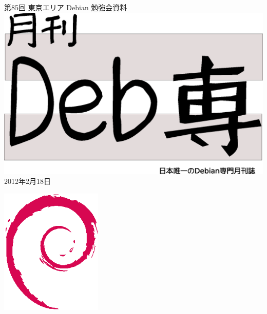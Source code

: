 \documentclass[mingoth,a4paper]{jsarticle}
\newcommand{\debmtgyear}{2012}
\newcommand{\debmtgmonth}{2}
\newcommand{\debmtgdate}{18}
\newcommand{\debmtgnumber}{85}
\begin{document}
\begin{titlepage}
\thispagestyle{empty}

\vspace*{-2cm}
第\debmtgnumber{}回 東京エリア Debian 勉強会資料\\
\hspace*{-2cm}
\includegraphics[width=210mm]{image201003/debsen.eps}\\
\hfill{}\debmtgyear{}年\debmtgmonth{}月\debmtgdate{}日



\vspace*{-2cm}
\hfill{}\includegraphics[height=6cm]{image200502/openlogo-nd.eps}
\end{titlepage}

\end{document}
